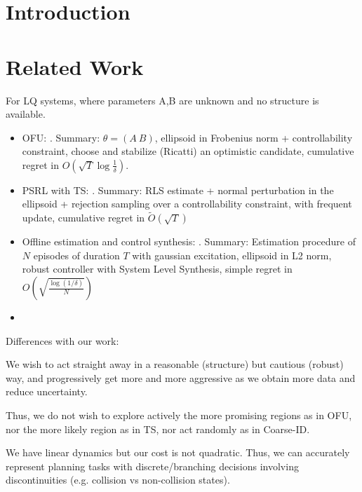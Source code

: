 \documentclass{article}
\begin{document}
	\begin{abstract}
		
	\end{abstract}

\section{Introduction}



\section{Related Work}

For LQ systems, where parameters A,B are unknown and no structure is available.
\begin{itemize}
    \item OFU: \citep{abbasi-yadkori11a}. Summary: $\theta=(A~B)$, ellipsoid in Frobenius norm + controllability constraint, choose and stabilize (Ricatti) an optimistic candidate, cumulative regret in $O(\sqrt{T}\log\frac{1}{\delta})$.
    \item PSRL with TS: \citep{abeille18a}. Summary: RLS estimate + normal perturbation in the ellipsoid + rejection sampling over a controllability constraint, with frequent update, cumulative regret in $\tilde{O}(\sqrt{T})$
    \item Offline estimation and control synthesis: \citep{Dean2017}. Summary: Estimation procedure of $N$ episodes of duration $T$ with gaussian excitation, ellipsoid in L2 norm, robust controller with System Level Synthesis, simple regret in $O(\sqrt{\frac{\log(1/\delta)}{N}})$
    \item \citep{Dean2018}
\end{itemize}

Differences with our work:
    
    We wish to act straight away in a reasonable (structure) but cautious (robust) way, and progressively get more and more aggressive as we obtain more data and reduce uncertainty.
    
    Thus, we do not wish to explore actively the more promising regions as in OFU, nor the more likely region as in TS, nor act randomly as in Coarse-ID.
    
    We have linear dynamics but our cost is not quadratic. Thus, we can accurately represent planning tasks with discrete/branching decisions involving discontinuities (e.g. collision vs non-collision states).
    
\end{document}
